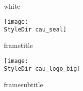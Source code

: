 {\begin{beamercolorbox}[wd=\paperwidth,ht=62.0mm,leftskip=2mm,dp=8mm, rightskip = 0.5mm]{white}
\begin{minipage}[b]{0.5\paperwidth}
                 \vspace{5mm}
            \insertdate \newline

            \insertinstitute
        \end{minipage}
        \begin{minipage}[c]{0.5\paperwidth}
            \begin{center}
                \texttt{[image: \\StyleDir cau\_seal]} %
            \end{center}
        \end{minipage}
    \end{beamercolorbox}
}

{
    \vspace{-1.75mm}
    \begin{beamercolorbox}[wd=\paperwidth,ht=7.4mm,leftskip=2mm,rightskip=-0.25mm,dp=2.75mm]{frametitle}
         \insertframetitle
        \hfill
        \begin{minipage}[c]{0.21\paperwidth}
            \vspace{-0.95mm}
            \texttt{[image: \\StyleDir cau\_logo\_big]}
        \end{minipage}
    \end{beamercolorbox}

    \vskip-0.6mm %

    \if\insertframesubtitle\empty
    \else
        \begin{beamercolorbox}[wd=\paperwidth,ht=3mm,leftskip=2.5mm,dp=1mm, rightskip = 0.5mm]{framesubtitle}
             \insertframesubtitle
        \end{beamercolorbox}
    \fi
}

